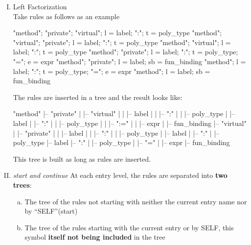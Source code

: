   \begin{enumerate}[(I)]
  \item Left Factorization \\
    Take rules as follows as an example
    
    \begin{ocamlcode}
      "method"; "private"; "virtual"; l = label; ":"; t = poly_type
      "method"; "virtual"; "private"; l = label; ":"; t = poly_type
      "method"; "virtual"; l = label; ":"; t = poly_type
      "method"; "private"; l = label; ":"; t = poly_type; "="; e = expr
      "method"; "private"; l = label; sb = fun_binding
      "method"; l = label; ":"; t = poly_type; "="; e = expr
      "method"; l = label; sb = fun_binding
    \end{ocamlcode}

    The rules are inserted in a tree and the result looks like:
    
\begin{ocamlcode}
  "method"
     |-- "private"
     |       |-- "virtual"
     |       |       |-- label
     |       |             |-- ":"
     |       |                  |-- poly_type
     |       |-- label
     |             |-- ":"
     |             |    |-- poly_type
     |             |            |-- ":="
     |             |                 |-- expr
     |             |-- fun_binding
     |-- "virtual"
     |       |-- "private"
     |       |       |-- label
     |       |             |-- ":"
     |       |                  |-- poly_type
     |       |-- label
     |             |-- ":"
     |                  |-- poly_type
     |-- label
           |-- ":"
           |    |-- poly_type
           |            |-- "="
           |                 |-- expr
           |-- fun_binding
      
    \end{ocamlcode}

This tree is built as long as rules are inserted.
\item \textit{start and continue}
  At each entry level, the rules are separated into \textbf{two
    trees}:
  \begin{enumerate}[(a)]
  \item The tree of the rules not starting with neither the current entry name
    nor by ``SELF''(start)
  \item The tree of the rules starting with the current entry or by
    SELF, this symbol \textbf{itself not being included} in the tree
  \end{enumerate}


\end{enumerate}
